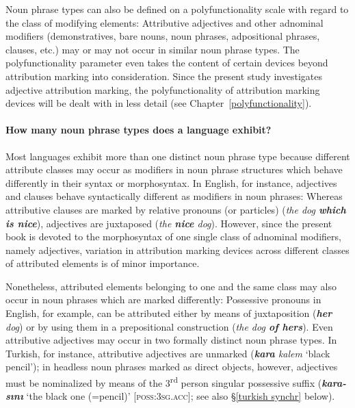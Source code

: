Noun phrase types can also be defined on a polyfunctionality scale with regard to the class of modifying elements: Attributive adjectives and other adnominal modifiers (demonstratives, bare nouns, noun phrases, adpositional phrases, clauses, etc.) may or may not occur in similar noun phrase types. The polyfunctionality parameter even takes the content of certain devices beyond attribution marking into consideration. Since the present study investigates adjective attribution marking, the polyfunctionality of attribution marking devices will be dealt with in less detail (see Chapter~\ref{polyfunctionality}). 

\paragraph{How many noun phrase types does a language exhibit?} 
Most languages exhibit more than one distinct noun phrase type because different attribute classes may occur as modifiers in noun phrase structures which behave differently in their syntax or morphosyntax. In English, for instance, adjectives and clauses behave syntactically different as modifiers in noun phrases: Whereas attributive clauses are marked by relative pronouns (or particles) (\textit{the dog \textbf{which is nice}}), adjectives are juxtaposed (\textit{the \textbf{nice} dog}). However, since the present book is devoted to the morphosyntax of one single class of adnominal modifiers, namely adjectives, variation in attribution marking devices across different classes of attributed elements is of minor importance. 

Nonetheless, attributed elements belonging to one and the same class may also occur in noun phrases which are marked differently: Possessive pronouns in English, for example, can be attributed either by means of juxtaposition (\textit{\textbf{her} dog}) or by using them in a prepositional construction (\textit{the dog \textbf{of hers}}). Even attributive adjectives may occur in two formally distinct noun phrase types. In Turkish, for instance, attributive adjectives are unmarked (\textit{\textbf{kara} kalem} ‘black pencil’); in headless noun phrases marked as direct objects, however, adjectives must be nominalized by means of the 3\textsuperscript{rd} person singular possessive suffix (\textit{\textbf{kara-sını}} ‘the black one (=pencil)’ [\textsc{poss:3sg.acc}]; see also \S\ref{turkish synchr} below). 

